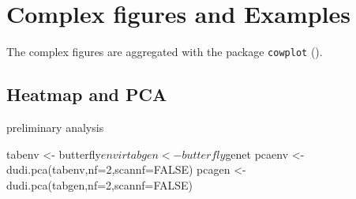 \documentclass[a4paper,10pt]{article}
\begin{document}
\section{Complex figures and Examples}

The complex figures are aggregated with the package \texttt{cowplot} (\cite{cowplot}).

\subsection{Heatmap and PCA}

preliminary analysis
\begin{Schunk}
\begin{Sinput}
  tabenv <- butterfly$envir
  tabgen <- butterfly$genet
  pcaenv <- dudi.pca(tabenv,nf=2,scannf=FALSE)
  pcagen <- dudi.pca(tabgen,nf=2,scannf=FALSE)
\end{Sinput}
\end{Schunk}
\end{document}
